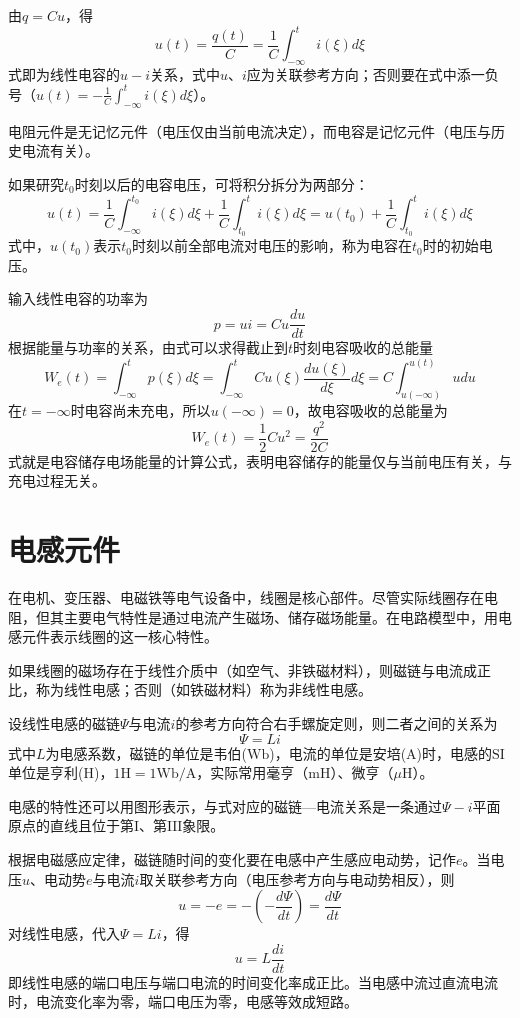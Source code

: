 由$q=Cu$，得
\[
u(t)=\frac{q(t)}{C}=\frac{1}{C}\int_{-∞}^ti(\xi)d\xi
\]
式即为线性电容的$u-i$关系，式中$u\text{、}i$应为关联参考方向；否则要在式中添一负号（$u(t)=-\frac{1}{C}\int_{-∞}^ti(\xi)d\xi$）。

电阻元件是无记忆元件（电压仅由当前电流决定），而电容是记忆元件（电压与历史电流有关）。

如果研究$t_0$时刻以后的电容电压，可将积分拆分为两部分：
\[
u(t)=\frac{1}{C}\int_{-∞}^{t_0}i(\xi)d\xi+\frac{1}{C}\int_{t_0}^ti(\xi)d\xi=u(t_0)+\frac{1}{C}\int_{t_0}^ti(\xi)d\xi
\]
式中，$u(t_0)$表示$t_0$时刻以前全部电流对电压的影响，称为电容在$t_0$时的初始电压。

输入线性电容的功率为
\[
p=ui=Cu\frac{du}{dt}
\]
根据能量与功率的关系，由式可以求得截止到$t$时刻电容吸收的总能量
\[
W_e(t)=\int_{-∞}^tp(\xi)d\xi=\int_{-∞}^tCu(\xi)\frac{du(\xi)}{d\xi}d\xi=C\int_{u(-∞)}^{u(t)}u du
\]
在$t=-∞$时电容尚未充电，所以$u(-∞)=0$，故电容吸收的总能量为
\[
W_e(t)=\frac{1}{2}Cu^2=\frac{q^2}{2C}
\]
式就是电容储存电场能量的计算公式，表明电容储存的能量仅与当前电压有关，与充电过程无关。

\section{电感元件}
在电机、变压器、电磁铁等电气设备中，线圈是核心部件。尽管实际线圈存在电阻，但其主要电气特性是通过电流产生磁场、储存磁场能量。在电路模型中，用电感元件表示线圈的这一核心特性。

如果线圈的磁场存在于线性介质中（如空气、非铁磁材料），则磁链与电流成正比，称为线性电感；否则（如铁磁材料）称为非线性电感。

设线性电感的磁链$\Psi$与电流$i$的参考方向符合右手螺旋定则，则二者之间的关系为
\[
\Psi=Li
\]
式中$L$为电感系数，磁链的单位是韦伯($\mathrm{Wb}$)，电流的单位是安培($\mathrm{A}$)时，电感的$\mathrm{SI}$单位是亨利($\mathrm{H}$)，$1\mathrm{H}=1\mathrm{Wb/A}$，实际常用毫亨（$\mathrm{mH}$）、微亨（$\mu\mathrm{H}$）。

电感的特性还可以用图形表示，与式对应的磁链—电流关系是一条通过$\Psi-i$平面原点的直线且位于第$\mathrm{I}$、第$\mathrm{III}$象限。

根据电磁感应定律，磁链随时间的变化要在电感中产生感应电动势，记作$e$。当电压$u$、电动势$e$与电流$i$取关联参考方向（电压参考方向与电动势相反），则
\[
u=-e=-(-\frac{d\Psi}{dt})=\frac{d\Psi}{dt}
\]
对线性电感，代入$\Psi=Li$，得
\[
u=L\frac{di}{dt}
\]
即线性电感的端口电压与端口电流的时间变化率成正比。当电感中流过直流电流时，电流变化率为零，端口电压为零，电感等效成短路。

